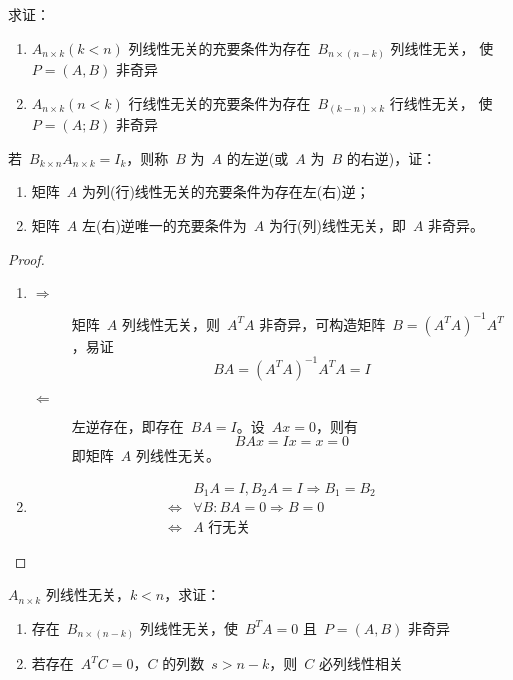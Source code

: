 \documentclass[twoside,openright]{book}
\begin{document}
\begin{CJK*}{UTF8}{}
\begin{quest}
\label{quest:147}
求证：
\begin{enumerate}
\item
$A_{n \times k}(k < n)$ 列线性无关的充要条件为存在\ $B_{n \times (n-k)}$ 列线性无关，
使\ $P=(A,B)$ 非奇异
\item
$A_{n \times k}(n < k)$ 行线性无关的充要条件为存在\ $B_{(k - n) \times k}$ 行线性无关，
使\ $P=(A;B)$ 非奇异
\end{enumerate}
\end{quest}

\begin{quest}
\label{quest:148}
若\ $B_{k \times n} A_{n \times k} = I_k$，则称\ $B$ 为\ $A$ 的左逆(或\ $A$ 为\ $B$ 的右逆)，证：
\begin{enumerate}
\item
矩阵\ $A$ 为列(行)线性无关的充要条件为存在左(右)逆；
\item
矩阵\ $A$ 左(右)逆唯一的充要条件为\ $A$ 为行(列)线性无关，即\ $A$ 非奇异。
\end{enumerate}
\end{quest}
\begin{proof}
$ $

\begin{enumerate}
\item
\begin{description}
\item[$\Longrightarrow$]
矩阵\ $A$ 列线性无关，则\ $A^T A$ 非奇异，可构造矩阵\ $B = (A^T A)^{-1} A^T$，易证
\[
B A = (A^T A)^{-1} A^T A = I
\]
\item[$\Longleftarrow$]
左逆存在，即存在\ $B A = I$。设\ $A x = 0$，则有
\[
B A x = I x = x = 0
\]
即矩阵\ $A$ 列线性无关。
\end{description}
\item
\[
\begin{split}
& B_1 A = I, B_2 A = I \Longrightarrow B_1 = B_2 \\
\Longleftrightarrow & \forall B: B A = 0 \Longrightarrow B = 0 \\
\Longleftrightarrow & A \text{ 行无关}
\end{split}
\]
\end{enumerate}
\end{proof}

\begin{quest}
\label{quest:149}
$A_{n \times k}$ 列线性无关，$k<n$，求证：
\begin{enumerate}
\item
存在\ $B_{n \times (n-k)}$ 列线性无关，使\ $B^T A=0$ 且\ $P=(A,B)$ 非奇异
\item
若存在\ $A^TC=0$，$C$ 的列数\ $s>n-k$，则\ $C$ 必列线性相关
\end{enumerate}
\end{quest}


\end{CJK*}
\end{document}
